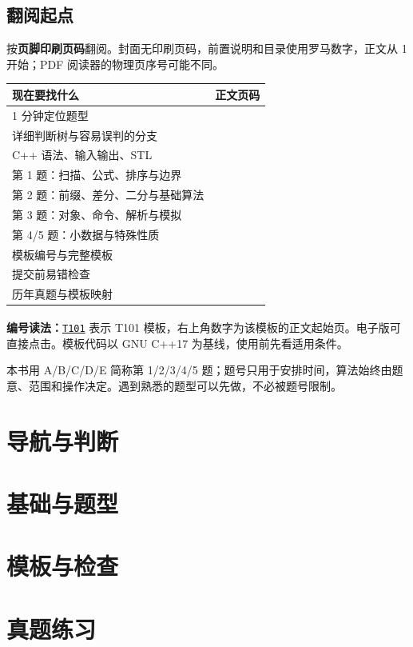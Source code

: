 \documentclass[11pt,a4paper,oneside]{ctexbook}
\newcommand{\Tref}[1]{\hyperref[tpl:#1]{\texttt{T#1}\textsuperscript{\pageref*{tpl:#1}}}}
\begin{document}
\chapter*{翻阅起点}
按\textbf{页脚印刷页码}翻阅。封面无印刷页码，前置说明和目录使用罗马数字，正文从 1 开始；PDF 阅读器的物理页序号可能不同。

\begin{longtable}{p{8.5cm}r}
\toprule
现在要找什么 & 正文页码\\
\midrule
1 分钟定位题型 & \pageref{ch:02}\\
详细判断树与容易误判的分支 & \pageref{ch:03}\\
C++ 语法、输入输出、STL & \pageref{ch:04}\\
第 1 题：扫描、公式、排序与边界 & \pageref{ch:05}\\
第 2 题：前缀、差分、二分与基础算法 & \pageref{ch:06}\\
第 3 题：对象、命令、解析与模拟 & \pageref{ch:07}\\
第 4/5 题：小数据与特殊性质 & \pageref{ch:08}\\
模板编号与完整模板 & \pageref{sec:template-map}\\
提交前易错检查 & \pageref{ch:10}\\
历年真题与模板映射 & \pageref{ch:11}\\
\bottomrule
\end{longtable}
\textbf{编号读法：}\Tref{101} 表示 T101 模板，右上角数字为该模板的正文起始页。电子版可直接点击。模板代码以 GNU C++17 为基线，使用前先看适用条件。

本书用 A/B/C/D/E 简称第 1/2/3/4/5 题；题号只用于安排时间，算法始终由题意、范围和操作决定。遇到熟悉的题型可以先做，不必被题号限制。

\tableofcontents

\mainmatter

\part{导航与判断}




\part{基础与题型}






\part{模板与检查}



\part{真题练习}

\end{document}

